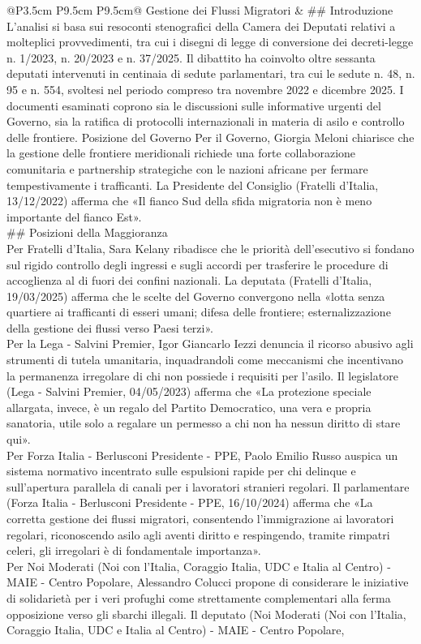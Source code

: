 \documentclass[a4paper,11pt]{article}
\begin{document}
\begin{landscape}
\begin{longtable}{@{}P{3.5cm} P{9.5cm} P{9.5cm}@{}}
\midrule
Gestione dei Flussi Migratori & \#\# Introduzione\\[6pt] L'analisi si basa sui resoconti stenografici della Camera dei Deputati relativi a molteplici provvedimenti, tra cui i disegni di legge di conversione dei decreti-legge n. 1/2023, n. 20/2023 e n. 37/2025. Il dibattito ha coinvolto oltre sessanta deputati intervenuti in centinaia di sedute parlamentari, tra cui le sedute n. 48, n. 95 e n. 554, svoltesi nel periodo compreso tra novembre 2022 e dicembre 2025. I documenti esaminati coprono sia le discussioni sulle informative urgenti del Governo, sia la ratifica di protocolli internazionali in materia di asilo e controllo delle frontiere. Posizione del Governo Per il Governo, Giorgia Meloni chiarisce che la gestione delle frontiere meridionali richiede una forte collaborazione comunitaria e partnership strategiche con le nazioni africane per fermare tempestivamente i trafficanti. La Presidente del Consiglio (Fratelli d'Italia, 13/12/2022) afferma che «Il fianco Sud della sfida migratoria non è meno importante del fianco Est».\\[6pt] \#\# Posizioni della Maggioranza\\[6pt] Per Fratelli d'Italia, Sara Kelany ribadisce che le priorità dell'esecutivo si fondano sul rigido controllo degli ingressi e sugli accordi per trasferire le procedure di accoglienza al di fuori dei confini nazionali. La deputata (Fratelli d'Italia, 19/03/2025) afferma che le scelte del Governo convergono nella «lotta senza quartiere ai trafficanti di esseri umani; difesa delle frontiere; esternalizzazione della gestione dei flussi verso Paesi terzi».\\[6pt] Per la Lega - Salvini Premier, Igor Giancarlo Iezzi denuncia il ricorso abusivo agli strumenti di tutela umanitaria, inquadrandoli come meccanismi che incentivano la permanenza irregolare di chi non possiede i requisiti per l'asilo. Il legislatore (Lega - Salvini Premier, 04/05/2023) afferma che «La protezione speciale allargata, invece, è un regalo del Partito Democratico, una vera e propria sanatoria, utile solo a regalare un permesso a chi non ha nessun diritto di stare qui».\\[6pt] Per Forza Italia - Berlusconi Presidente - PPE, Paolo Emilio Russo auspica un sistema normativo incentrato sulle espulsioni rapide per chi delinque e sull'apertura parallela di canali per i lavoratori stranieri regolari. Il parlamentare (Forza Italia - Berlusconi Presidente - PPE, 16/10/2024) afferma che «La corretta gestione dei flussi migratori, consentendo l'immigrazione ai lavoratori regolari, riconoscendo asilo agli aventi diritto e respingendo, tramite rimpatri celeri, gli irregolari è di fondamentale importanza».\\[6pt] Per Noi Moderati (Noi con l'Italia, Coraggio Italia, UDC e Italia al Centro) - MAIE - Centro Popolare, Alessandro Colucci propone di considerare le iniziative di solidarietà per i veri profughi come strettamente complementari alla ferma opposizione verso gli sbarchi illegali. Il deputato (Noi Moderati (Noi con l'Italia, Coraggio Italia, UDC e Italia al Centro) - MAIE - Centro Popolare, 
\end{longtable}
\end{landscape}
\end{document}
